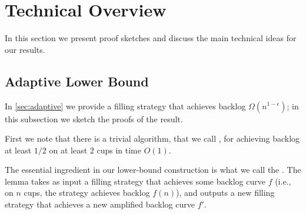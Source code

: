 \section{Technical Overview}
\label{sec:technical_overview}

In this section we present proof sketches and discuss the main technical ideas for our results. 

\subsection{Adaptive Lower Bound}\label{sec:technicaladaptive}
In \cref{sec:adaptive} we provide a filling strategy that achieves
backlog $\Omega(n^{1 - \epsilon})$; in this subsection we sketch the
proofs of the result.

First we note that there is a trivial algorithm, that we call
, for achieving backlog at least $1/2$ on at
least $2$ cups in time $O(1)$.

The essential ingredient in our lower-bound construction is what we
call the . The lemma takes as input a
filling strategy that achieves some backlog curve $f$ (i.e., on $n$
cups, the strategy achieves backlog $f(n)$), and outputs a new filling
strategy that achieves a new amplified backlog curve $f'$.


